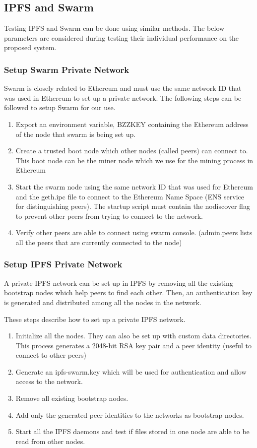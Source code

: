 \documentclass[11pt,openright]{report}
\begin{document}
\subsection{IPFS and Swarm}
Testing IPFS and Swarm can be done using similar methods. The below parameters are considered during testing their individual performance on the proposed system. 

\subsubsection{Setup Swarm Private Network}
Swarm is closely related to Ethereum and must use the same network ID that was used in Ethereum to set up a private network.
The following steps can be followed to setup Swarm for our use.
\begin{enumerate}
    \item Export an environment variable, BZZKEY containing the Ethereum address of the node that swarm is being set up.
    \item Create a trusted boot node which other nodes (called peers) can connect to. This boot node can be the miner node which we use for the mining process in Ethereum
    \item Start the swarm node using the same network ID that was used for Ethereum and the geth.ipc file to connect to the Ethereum Name Space (ENS service for distinguishing peers). The startup script must contain the nodiscover flag to prevent other peers from trying to connect to the network.
    \item Verify other peers are able to connect using swarm console. (admin.peers lists all the peers that are currently connected to the node)
\end{enumerate}

\subsubsection{Setup IPFS Private Network}
A private IPFS network can be set up in IPFS by removing all the existing bootstrap nodes which help peers to find each other. Then, an authentication key is generated and distributed among all the nodes in the network.

These steps describe how to set up a private IPFS network.
\begin{enumerate}
    \item Initialize all the nodes. They can also be set up with custom data directories. This process generates a 2048-bit RSA key pair and a peer identity (useful to connect to other peers)
    \item Generate an ipfs-swarm.key which will be used for authentication and allow access to the network.
    \item Remove all existing bootstrap nodes.
    \item Add only the generated peer identities to the networks as bootstrap nodes.
    \item Start all the IPFS daemons and test if files stored in one node are able to be read from other nodes.
\end{enumerate}
\end{document}
